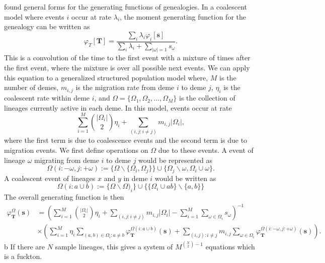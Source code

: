 \citet{Lohse2011} found general forms for the generating functions of
genealogies. In a coalescent model where events $i$ occur at rate $ \lambda_i $,
the moment generating function for the genealogy can be written as
\begin{equation}
  \varphi_{T}\left[ \mathbf{T} \right] = \frac{
    \sum_i \lambda_i \varphi_i[\mathbf{s}]}{
    \sum_i \lambda_i + \sum_{|\omega|=1}s_{\omega}}.
\end{equation}
This is a convolution of the time to the first event with a mixture of times
after the first event, where the mixture is over all possible next events. We
can apply this equation to a generalized structured population model where, $M$
is the number of demes, $m_{i,j}$ is the migration rate from deme $i$ to deme
$j$, $\eta_i$ is the coalescent rate within deme $i$, and
$\Omega = \{ \Omega_1, \Omega_2, \ldots , \Omega_M \}$ is the collection of
lineages currently active in each deme. In this model, events occur at rate
\begin{equation}
  \sum_{i=1}^M \binom{|\Omega_i|}{2}\eta_i + \sum_{(i,j:i \neq j)} m_{i,j}|\Omega_i|,
\end{equation}
where the first term is due to coalescence events and the second term is due to
migration events. We first define operations on $\Omega$ due to these events. A
event of lineage $\omega$ migrating from deme $i$ to deme $j$ would be
represented as
\begin{equation*}
  \Omega\left( i  :-\omega,j: + \omega \right) := \{ \Omega\backslash \{\Omega_i, \Omega_j \} \} \cup
  \{\Omega_j\backslash \omega, \Omega_i \cup \omega \}. 
\end{equation*}
A coalescent event of lineages $x$ and $y$ in deme $i$ would be
written as 
\begin{equation*}
  \Omega(i:a \cup b):=\{ \Omega \backslash \Omega)_i \}\cup\{ \{\Omega_i \cup ab \}\backslash \{ a,b \}\}
\end{equation*}
The overall generating function is then
\begin{align}
  \varphi_{\mathbf{T}}^{\Omega}(\mathbf{s}) &=
                                              \left( \sum_{i=1}^M \binom{|\Omega_i|}{2}\eta_i  + \sum_{(i,j:i \neq j)} m_{i,j}|\Omega_i| -
                                              \sum_{i=1}^M \sum_{\omega \in \Omega_i}s_{\omega}\right)^{-1} \\
                                            &\times \left( \sum_{i=1}^M \eta_i \sum_{(a,b) \in \Omega_i:a \neq b}
                                              \varphi_{\mathbf{T}}^{\Omega(i:a \cup b)}(\mathbf{s}) + 
                                              \sum_{(i,j):i\neq j}m_{i,j}\sum_{\omega \in \Omega_i} \varphi_{\mathbf{T}}^{\Omega\left( i :-\omega, j: + \omega \right)}(\mathbf{s})\right).
\end{align}b
If there are $N$ sample lineages, this gives a system of $M^{\binom{N}{2}-1}$
equations which is a fuckton.

